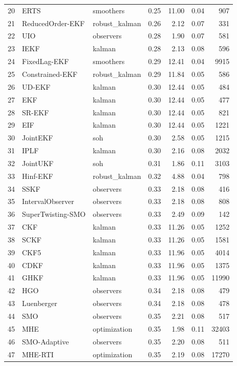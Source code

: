 \begin{longtable}{rllrrrr}
20 & ERTS & smoothers & 0.25 & 11.00 & 0.04 & 907 \\
21 & ReducedOrder-EKF & robust\_kalman & 0.26 & 2.12 & 0.07 & 331 \\
22 & UIO & observers & 0.28 & 1.90 & 0.07 & 581 \\
23 & IEKF & kalman & 0.28 & 2.13 & 0.08 & 596 \\
24 & FixedLag-EKF & smoothers & 0.29 & 12.41 & 0.04 & 9915 \\
25 & Constrained-EKF & robust\_kalman & 0.29 & 11.84 & 0.05 & 586 \\
26 & UD-EKF & kalman & 0.30 & 12.44 & 0.05 & 484 \\
27 & EKF & kalman & 0.30 & 12.44 & 0.05 & 477 \\
28 & SR-EKF & kalman & 0.30 & 12.44 & 0.05 & 821 \\
29 & EIF & kalman & 0.30 & 12.44 & 0.05 & 1221 \\
30 & JointEKF & soh & 0.30 & 2.58 & 0.05 & 1215 \\
31 & IPLF & kalman & 0.30 & 2.16 & 0.08 & 2032 \\
32 & JointUKF & soh & 0.31 & 1.86 & 0.11 & 3103 \\
33 & Hinf-EKF & robust\_kalman & 0.32 & 4.88 & 0.04 & 798 \\
34 & SSKF & observers & 0.33 & 2.18 & 0.08 & 416 \\
35 & IntervalObserver & observers & 0.33 & 2.18 & 0.08 & 808 \\
36 & SuperTwisting-SMO & observers & 0.33 & 2.49 & 0.09 & 142 \\
37 & CKF & kalman & 0.33 & 11.26 & 0.05 & 1252 \\
38 & SCKF & kalman & 0.33 & 11.26 & 0.05 & 1581 \\
39 & CKF5 & kalman & 0.33 & 11.96 & 0.05 & 4014 \\
40 & CDKF & kalman & 0.33 & 11.96 & 0.05 & 1375 \\
41 & GHKF & kalman & 0.33 & 11.96 & 0.05 & 11990 \\
42 & HGO & observers & 0.34 & 2.18 & 0.08 & 479 \\
43 & Luenberger & observers & 0.34 & 2.18 & 0.08 & 478 \\
44 & SMO & observers & 0.35 & 2.21 & 0.08 & 517 \\
45 & MHE & optimization & 0.35 & 1.98 & 0.11 & 32403 \\
46 & SMO-Adaptive & observers & 0.35 & 2.20 & 0.08 & 511 \\
47 & MHE-RTI & optimization & 0.35 & 2.19 & 0.08 & 17270 \\

\end{longtable}
